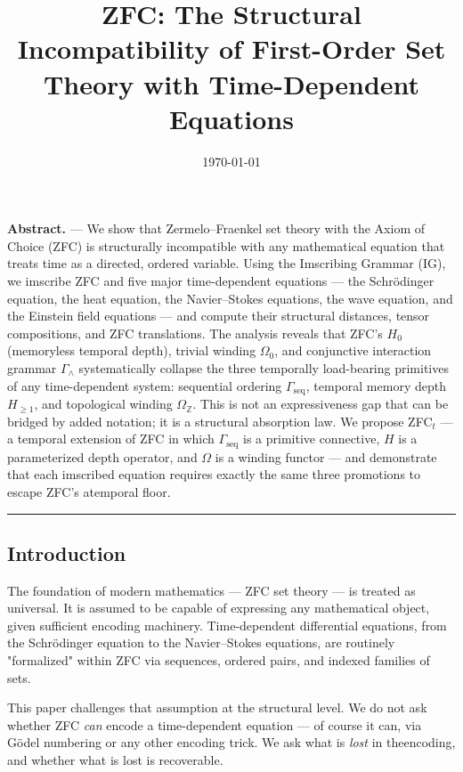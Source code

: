 \documentclass[12pt,a4paper]{article}
\begin{document}
\title{ZFC: The Structural Incompatibility of First-Order Set Theory with Time-Dependent Equations}
\date{\today}

\maketitle

\textbf{Abstract.} --- We show that Zermelo--Fraenkel set theory with the Axiom of Choice (ZFC) is structurally incompatible with any mathematical equation that treats time as a directed, ordered variable. Using the Imscribing Grammar (IG), we imscribe ZFC and five major time-dependent equations --- the Schrödinger equation, the heat equation, the Navier--Stokes equations, the wave equation, and the Einstein field equations --- and compute their structural distances, tensor compositions, and ZFC translations. The analysis reveals that ZFC's $H_0$ (memoryless temporal depth), trivial winding $\Omega_0$, and conjunctive interaction grammar $\Gamma_{\wedge}$ systematically collapse the three temporally load-bearing primitives of any time-dependent system: sequential ordering $\Gamma_\text{seq}$, temporal memory depth $H_{\geq 1}$, and topological winding $\Omega_\mathbb{Z}$. This is not an expressiveness gap that can be bridged by added notation; it is a structural absorption law. We propose ZFC$_t$ --- a temporal extension of ZFC in which $\Gamma_\text{seq}$ is a primitive connective, $H$ is a parameterized depth operator, and $\Omega$ is a winding functor --- and demonstrate that each imscribed equation requires exactly the same three promotions to escape ZFC's atemporal floor.

\begin{center}
\rule{0.5\textwidth}{0.4pt}
\end{center}

\subsection{Introduction}

The foundation of modern mathematics --- ZFC set theory --- is treated as universal. It is assumed to be capable of expressing any mathematical object, given sufficient encoding machinery. Time-dependent differential equations, from the Schrödinger equation to the Navier--Stokes equations, are routinely "formalized" within ZFC via sequences, ordered pairs, and indexed families of sets.

This paper challenges that assumption at the structural level. We do not ask whether ZFC \emph{can} encode a time-dependent equation --- of course it can, via Gödel numbering or any other encoding trick. We ask what is \emph{lost} in theencoding, and whether what is lost is recoverable.
\end{document}
